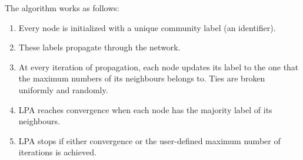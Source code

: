 \documentclass[twoside]{article}
\begin{document}
The algorithm works as follows:
\begin{enumerate}
\item Every node is initialized with a unique community label (an identifier).
\item These labels propagate through the network.
\item At every iteration of propagation, each node updates its label to the one that the maximum numbers of its neighbours belongs to. Ties are broken uniformly and randomly.
\item LPA reaches convergence when each node has the majority label of its neighbours.
\item LPA stops if either convergence or the user-defined maximum number of iterations is achieved.
\end{enumerate}
\end{document}
